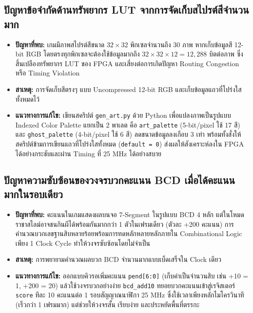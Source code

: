 \documentclass[12pt,a4paper]{article}
\begin{document}
\subsection{ปัญหาข้อจำกัดด้านทรัพยากร LUT จากการจัดเก็บสไปรต์สีจำนวนมาก}
\begin{itemize}[leftmargin=1.5cm]
    \item \textbf{ปัญหาที่พบ:} เกมมีภาพสไปรต์สีขนาด $32\times32$ พิกเซลจำนวนถึง 30 ภาพ หากเก็บข้อมูลสี 12-bit RGB โดยตรงทุกพิกเซลจะต้องใช้ข้อมูลมากถึง $32 \times 32 \times 12 = 12,288$ บิตต่อภาพ ซึ่งสิ้นเปลืองทรัพยากร LUT ของ FPGA และเสี่ยงต่อการเกิดปัญหา Routing Congestion หรือ Timing Violation
    \item \textbf{สาเหตุ:} การจัดเก็บสีตรงๆ แบบ Uncompressed 12-bit RGB และเก็บข้อมูลแถวที่โปร่งใสทั้งหมดไว้
    \item \textbf{แนวทางการแก้ไข:} เขียนสคริปต์ \texttt{gen\_art.py} ด้วย Python เพื่อแปลงภาพเป็นรูปแบบ Indexed Color Palette แยกเป็น 2 พาเลต คือ \texttt{art\_palette} (5-bit/pixel ใช้ 17 สี) และ \texttt{ghost\_palette} (4-bit/pixel ใช้ 6 สี) ลดขนาดข้อมูลลงเกือบ 3 เท่า พร้อมทั้งสั่งให้สคริปต์ข้ามการเขียนแถวที่โปร่งใสทั้งหมด (\texttt{default = 0}) ส่งผลให้สังเคราะห์ลงใน FPGA ได้อย่างกระชับและผ่าน Timing ที่ 25 MHz ได้อย่างสบาย
\end{itemize}

\subsection{ปัญหาความซับซ้อนของวงจรบวกคะแนน BCD เมื่อได้คะแนนมากในรอบเดียว}
\begin{itemize}[leftmargin=1.5cm]
    \item \textbf{ปัญหาที่พบ:} คะแนนในเกมแสดงผลบนจอ 7-Segment ในรูปแบบ BCD 4 หลัก แต่ในโหมดราชาสไลม์อาจชนกินผีได้พร้อมกันมากกว่า 1 ตัวในเฟรมเดียว (ตัวละ +200 คะแนน) การคำนวณบวกเลขฐานสิบหลายร้อยพร้อมการทดหลักหลายหลักภายใน Combinational Logic เพียง 1 Clock Cycle ทำให้วงจรซับซ้อนโดยไม่จำเป็น
    \item \textbf{สาเหตุ:} การพยายามคำนวณผลบวก BCD จำนวนมากแบบเบ็ดเสร็จใน Clock เดียว
    \item \textbf{แนวทางการแก้ไข:} ออกแบบคิวรอเพิ่มคะแนน \texttt{pend[6:0]} (เก็บค่าเป็นจำนวนสิบ เช่น +10 = 1, +200 = 20) แล้วใช้วงจรบวกอย่างง่าย \texttt{bcd\_add10} ทยอยบวกคะแนนเข้าสู่เรจิสเตอร์ \texttt{score} ทีละ 10 คะแนนต่อ 1 รอบสัญญาณนาฬิกา 25 MHz ซึ่งใช้เวลาเพียงหลักไมโครวินาที (เร็วกว่า 1 เฟรมมาก) แต่ช่วยให้วงจรสั้น เรียบง่าย และประหยัดพื้นที่ตรรกะ
\end{itemize}
\end{document}
